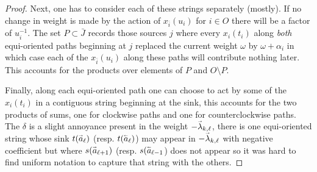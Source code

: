 \documentclass[12pt]{amsart}
\renewcommand{\vec}[1]{\accentset{\shortrightarrow}{#1}}
\newcommand{\cev}[1]{\accentset{\shortleftarrow}{#1}}
\numberwithin{equation}{section}
\begin{document}
{\begin{proof}
    Next, one has to consider each of these strings separately (mostly).  If no change in weight is made by the action of $x_{\bar{i}}(u_i)$ for $i\in O$ there will be a factor of $u_i^{-1}$.  The set $P\subset\bar{J}$ records those sources $j$ where every $x_i(t_i)$ along \emph{both} equi-oriented paths beginning at $j$ replaced the current weight $\omega$ by $\omega+\alpha_i$ in which case each of the $x_{\bar{i}}(u_i)$ along these paths will contribute nothing later.  This accounts for the products over elements of $P$ and $O\setminus P$.

    Finally, along each equi-oriented path one can choose to act by some of the $x_i(t_i)$ in a contiguous string beginning at the sink, this accounts for the two products of sums, one for clockwise paths and one for counterclockwise paths.  The $\delta$ is a slight annoyance present in the weight $-\vec{\lambda}_{k,\ell}$, there is one equi-oriented string whose sink $t(\vec{a}_\ell)$ (resp. $t(\cev{a}_\ell)$) may appear in $-\vec{\lambda}_{k,\ell}$ with negative coefficient but where $s(\vec{a}_{\ell+1})$ (resp. $s(\cev{a}_{\ell-1}$) does not appear so it was hard to find uniform notation to capture that string with the others.
  \end{proof}}%
\end{document}
